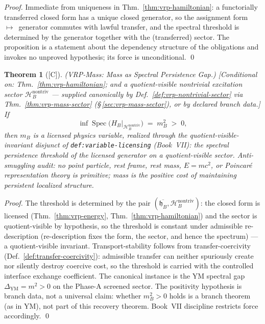 \documentclass[12pt,oneside]{amsbook}
\theoremstyle{plain}
\newtheorem{theorem}{Theorem}[section]
\theoremstyle{definition}
\theoremstyle{remark}
\newcommand{\status}[1]{\textup{[#1]}}
\begin{document}
\begin{proof}
Immediate from uniqueness in Thm.~\ref{thm:vrp-hamiltonian}: a
functorially transferred closed form has a unique closed
generator, so the assignment form~$\mapsto$~generator commutes
with lawful transfer, and the spectral threshold is determined by
the generator together with the (transferred) sector.  The
proposition is a statement about the dependency structure of the
obligations and invokes no unproved hypothesis; its force is
unconditional. \qed
\end{proof}

\begin{theorem}[\status{C}]\label{thm:vrp-mass}
\textup{(VRP-Mass: Mass as Spectral Persistence Gap.)}
\textup{[Conditional on: Thm.~\ref{thm:vrp-hamiltonian}; and a
quotient-visible nontrivial excitation sector
$\mathcal{H}_B^{\mathrm{nontriv}}$ --- supplied canonically by
Def.~\ref{def:vrp-nontrivial-sector} via
Thm.~\ref{thm:vrp-mass-sector} (\S\,\ref{sec:vrp-mass-sector}),
or by declared branch data.]}
If
\[
  \inf \operatorname{Spec}\bigl(H_B|_{\mathcal{H}_B^{\mathrm{nontriv}}}\bigr)
  \;=\; m_B^2 \;>\; 0,
\]
then $m_B$ is a licensed physics variable, realized through the
quotient-visible-invariant disjunct of
\texttt{def:variable-licensing} (Book~VII): the spectral
persistence threshold of the licensed generator on a
quotient-visible sector.  Anti-smuggling audit: no point particle,
rest frame, rest mass, $E = mc^2$, or Poincar\'e representation
theory is primitive; mass is the positive cost of maintaining
persistent localized structure.
\end{theorem}

\begin{proof}
The threshold is determined by the pair
$(\overline{\mathfrak{h}_B}, \mathcal{H}_B^{\mathrm{nontriv}})$:
the closed form is licensed (Thm.~\ref{thm:vrp-energy},
Thm.~\ref{thm:vrp-hamiltonian}) and the sector is quotient-visible
by hypothesis, so the threshold is constant under admissible
re-description (re-description fixes the form, the sector, and
hence the spectrum) --- a quotient-visible invariant.
Transport-stability follows from transfer-coercivity
(Def.~\ref{def:transfer-coercivity}): admissible transfer can
neither spuriously create nor silently destroy coercive cost, so
the threshold is carried with the controlled interface exchange
coefficient.  The canonical instance is the YM spectral gap
$\Delta_{\mathrm{YM}} = m^2 > 0$ on the Phase-A screened sector.
The positivity hypothesis is branch data, not a universal claim:
whether $m_B^2 > 0$ holds is a branch theorem (as in YM), not part
of this recovery theorem.  Book~VII discipline restricts force
accordingly. \qed
\end{proof}
\end{document}
